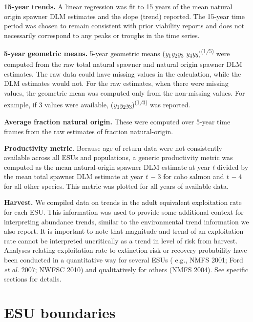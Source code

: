 \documentclass[
  letterpaper,
  oneside,
  open=any]{scrbook}
\begin{document}
\textbf{15-year trends. } A linear regression was fit to 15 years of the
mean natural origin spawner DLM estimates and the slope (trend)
reported. The 15-year time period was chosen to remain consistent with
prior viability reports and does not necessarily correspond to any peaks
or troughs in the time series.

\textbf{5-year geometric means. } 5-year geometric means
(\emph{y}\textsubscript{1}\emph{y}\textsubscript{2}\emph{y}\textsubscript{3}
\emph{y}\textsubscript{4}\emph{y}\textsubscript{5})\textsuperscript{(1\emph{/}5)}
were computed from the raw total natural spawner and natural origin
spawner DLM estimates. The raw data could have missing values in the
calculation, while the DLM estimates would not. For the raw estimates,
when there were missing values, the geometric mean was computed only
from the non-missing values. For example, if 3 values were available,
(\emph{y}\textsubscript{1}\emph{y}\textsubscript{2}\emph{y}\textsubscript{3})\textsuperscript{(1\emph{/}3)}
was reported.

\textbf{Average fraction natural origin. } These were computed over
5-year time frames from the raw estimates of fraction natural-origin.

\textbf{Productivity metric.} Because age of return data were not
consistently available across all ESUs and populations, a generic
productivity metric was computed as the mean natural-origin spawner DLM
estimate at year \emph{t} divided by the mean total spawner DLM estimate
at year \emph{t −} 3 for coho salmon and \emph{t −} 4 for all other
species. This metric was plotted for all years of available data.

\textbf{Harvest.} We compiled data on trends in the adult equivalent
exploitation rate for each ESU. This information was used to provide
some additional context for interpreting abundance trends, similar to
the environmental trend information we also report. It is important to
note that magnitude and trend of an exploitation rate cannot be
interpreted uncritically as a trend in level of risk from harvest.
Analyses relating exploitation rate to extinction risk or recovery
probability have been conducted in a quantitative way for several ESUs (
e.g., NMFS 2001; Ford \emph{et al.} 2007; NWFSC 2010) and qualitatively
for others (NMFS 2004). See specific sections for details.


\hypertarget{esu-boundaries}{%
\chapter{ESU boundaries}\label{esu-boundaries}}
\end{document}
